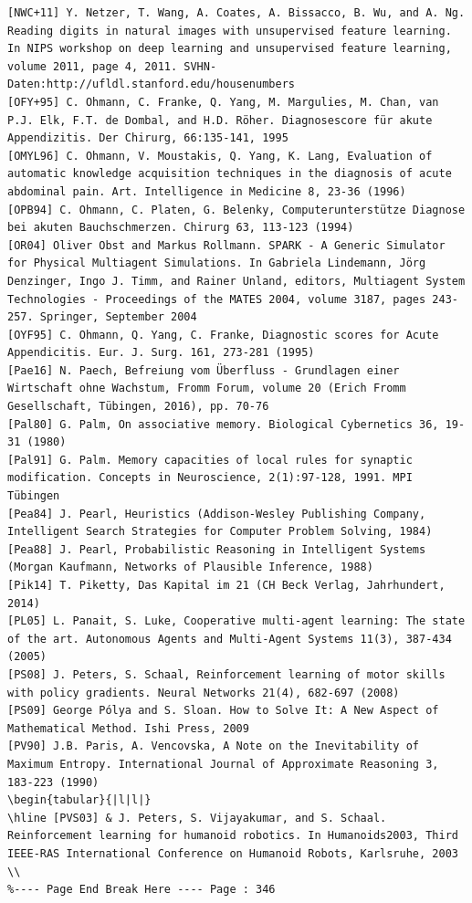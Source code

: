 \documentclass[10pt]{book}
\begin{document}
\begin{center}
\begin{enumerate}
\begin{center}
\begin{center}
\begin{center}
\begin{center}
\begin{center}
\begin{verbatim}
[NWC+11] Y. Netzer, T. Wang, A. Coates, A. Bissacco, B. Wu, and A. Ng. Reading digits in natural images with unsupervised feature learning. In NIPS workshop on deep learning and unsupervised feature learning, volume 2011, page 4, 2011. SVHN-Daten:http://ufldl.stanford.edu/housenumbers
[OFY+95] C. Ohmann, C. Franke, Q. Yang, M. Margulies, M. Chan, van P.J. Elk, F.T. de Dombal, and H.D. Röher. Diagnosescore für akute Appendizitis. Der Chirurg, 66:135-141, 1995
[OMYL96] C. Ohmann, V. Moustakis, Q. Yang, K. Lang, Evaluation of automatic knowledge acquisition techniques in the diagnosis of acute abdominal pain. Art. Intelligence in Medicine 8, 23-36 (1996)
[OPB94] C. Ohmann, C. Platen, G. Belenky, Computerunterstütze Diagnose bei akuten Bauchschmerzen. Chirurg 63, 113-123 (1994)
[OR04] Oliver Obst and Markus Rollmann. SPARK - A Generic Simulator for Physical Multiagent Simulations. In Gabriela Lindemann, Jörg Denzinger, Ingo J. Timm, and Rainer Unland, editors, Multiagent System Technologies - Proceedings of the MATES 2004, volume 3187, pages 243-257. Springer, September 2004
[OYF95] C. Ohmann, Q. Yang, C. Franke, Diagnostic scores for Acute Appendicitis. Eur. J. Surg. 161, 273-281 (1995)
[Pae16] N. Paech, Befreiung vom Überfluss - Grundlagen einer Wirtschaft ohne Wachstum, Fromm Forum, volume 20 (Erich Fromm Gesellschaft, Tübingen, 2016), pp. 70-76
[Pal80] G. Palm, On associative memory. Biological Cybernetics 36, 19-31 (1980)
[Pal91] G. Palm. Memory capacities of local rules for synaptic modification. Concepts in Neuroscience, 2(1):97-128, 1991. MPI Tübingen
[Pea84] J. Pearl, Heuristics (Addison-Wesley Publishing Company, Intelligent Search Strategies for Computer Problem Solving, 1984)
[Pea88] J. Pearl, Probabilistic Reasoning in Intelligent Systems (Morgan Kaufmann, Networks of Plausible Inference, 1988)
[Pik14] T. Piketty, Das Kapital im 21 (CH Beck Verlag, Jahrhundert, 2014)
[PL05] L. Panait, S. Luke, Cooperative multi-agent learning: The state of the art. Autonomous Agents and Multi-Agent Systems 11(3), 387-434 (2005)
[PS08] J. Peters, S. Schaal, Reinforcement learning of motor skills with policy gradients. Neural Networks 21(4), 682-697 (2008)
[PS09] George Pólya and S. Sloan. How to Solve It: A New Aspect of Mathematical Method. Ishi Press, 2009
[PV90] J.B. Paris, A. Vencovska, A Note on the Inevitability of Maximum Entropy. International Journal of Approximate Reasoning 3, 183-223 (1990)
\begin{tabular}{|l|l|}
\hline [PVS03] & J. Peters, S. Vijayakumar, and S. Schaal. Reinforcement learning for humanoid robotics. In Humanoids2003, Third IEEE-RAS International Conference on Humanoid Robots, Karlsruhe, 2003 \\
%---- Page End Break Here ---- Page : 346


\end{verbatim}
\end{center}
\end{center}
\end{center}
\end{center}
\end{center}
\end{enumerate}
\end{center}
\end{document}
